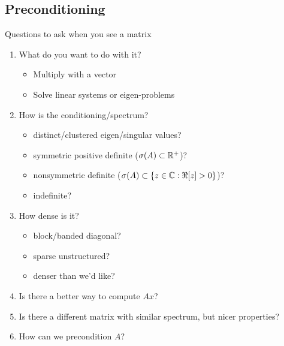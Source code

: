\subsection{Preconditioning}



\begin{frame}{Questions to ask when you see a matrix}
  \begin{enumerate}
  \item What do you want to do with it?
    \begin{itemize}
    \item Multiply with a vector
    \item Solve linear systems or eigen-problems
    \end{itemize}
  \item How is the conditioning/spectrum?
    \begin{itemize}
    \item distinct/clustered eigen/singular values?
    \item symmetric positive definite ($\sigma(A) \subset \mathbb{R}^+$)?
    \item nonsymmetric definite ($\sigma(A) \subset \{z \in \mathbb{C} : \Re [z] > 0 \}$)?
    \item indefinite?
    \end{itemize}
  \item How dense is it?
    \begin{itemize}
    \item block/banded diagonal?
    \item sparse unstructured?
    \item denser than we'd like?
    \end{itemize}
  \item Is there a better way to compute $Ax$?
  \item Is there a different matrix with similar spectrum, but nicer properties?
  \item \alert<2>{How can we precondition $A$?}
  \end{enumerate}
\end{frame}


